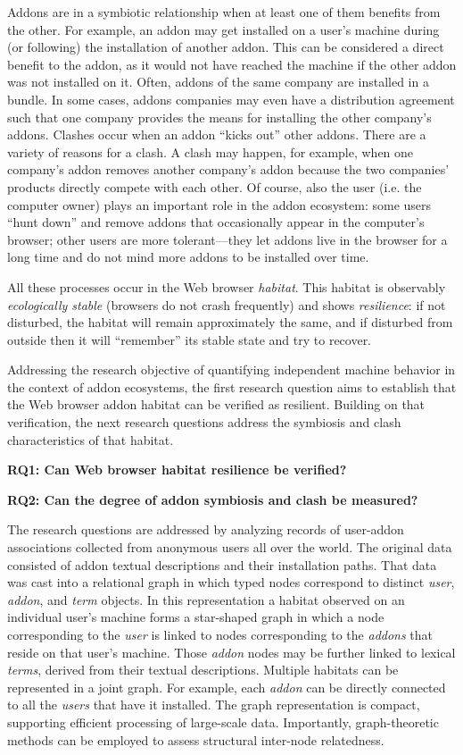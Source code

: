 \documentclass[10pt,letterpaper]{article}
\begin{document}
Addons are in a symbiotic relationship when at least one of them benefits from the other. For example, an addon may get installed on a user's machine during (or following) the installation of another addon. This can be considered a direct benefit to the addon, as it would not have reached the machine if the other addon was not installed on it. Often, addons of the same company are installed in a bundle. In some cases, addons companies may even have a distribution agreement such that one company provides the means for installing the other company's addons. Clashes occur when an addon ``kicks out'' other addons. There are a variety of reasons for a clash. A clash may happen, for example, when one company's addon removes another company's addon because the two companies' products directly compete with each other. Of course, also the user (i.e. the computer owner) plays an important role in the addon ecosystem: some users ``hunt down'' and remove addons that occasionally appear in the computer's browser; other users are more tolerant---they let addons live in the browser for a long time and do not mind more addons to be installed over time. 

All these processes occur in the Web browser \textit{habitat}. This habitat is observably \textit{ecologically stable} (browsers do not crash frequently) and shows \textit{resilience}: if not disturbed, the habitat will remain approximately the same, and if disturbed from outside then it will ``remember'' its stable state and try to recover. 

Addressing the research objective of quantifying independent machine behavior in the context of addon ecosystems, the first research question aims to establish that the Web browser addon habitat can be verified as resilient. Building on that verification, the next research questions address the symbiosis and clash characteristics of that habitat. 

\noindent \textbf{RQ1: Can Web browser habitat resilience be verified?}

\noindent \textbf{RQ2: Can the degree of addon symbiosis and clash be measured?}

The research questions are addressed by analyzing records of user-addon associations collected from anonymous users all over the world. The original data consisted of addon textual descriptions and their installation paths. That data was cast into a relational graph in which typed nodes correspond to distinct \textit{user}, \textit{addon}, and \textit{term} objects. In this representation a habitat observed on an individual user's machine forms a star-shaped graph in which a node corresponding to the \textit{user} is linked to nodes corresponding to the \textit{addons} that reside on that user's machine. Those \textit{addon} nodes may be further linked to lexical\textit{ terms}, derived from their textual descriptions. Multiple habitats can be represented in a joint graph. For example, each \textit{addon} can be directly connected to all the \textit{users} that have it installed. The graph representation is compact, supporting efficient processing of large-scale data. Importantly, graph-theoretic methods can be employed to assess structural inter-node relatedness.
\end{document}
